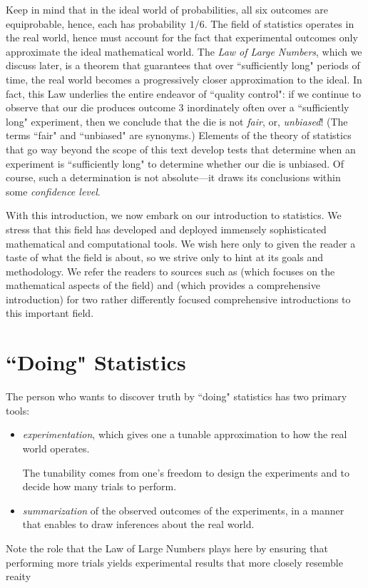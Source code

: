   
Keep in mind that in the ideal world of probabilities, all six outcomes are equiprobable, hence, 
each has probability $1/6$.  The field of statistics operates in the real world, hence must 
account for the fact that experimental outcomes only approximate the ideal mathematical world.  
The {\it Law of Large Numbers}, which we discuss later, is a theorem that guarantees that over 
``sufficiently long" periods of time, the real world becomes a progressively closer approximation 
to the ideal. In fact, this Law underlies the entire endeavor of ``quality control": if we continue to 
observe that our die produces outcome $3$ inordinately often over a ``sufficiently long" 
experiment, then we conclude that the die is not {\em fair}, or, {\em unbiased}!  (The terms
``fair" and ``unbiased" are synonyms.) Elements of the theory of statistics that go way beyond 
the scope of this text develop tests that determine when an experiment is ``sufficiently long" to 
determine whether our die is unbiased.  Of course, such a determination is not absolute---it
draws its conclusions within some {\em confidence level}.

With this introduction, we now embark on our introduction to statistics.  We stress that this
field has developed and deployed immensely sophisticated mathematical and
computational tools.  We wish here only to given the reader a taste of what the field is
about, so we strive only to hint at its goals and methodology.  We refer the readers to sources
such as \cite{Hoel58} (which focuses on the mathematical aspects of the field) and 
\cite{Bremaud17}  (which provides a comprehensive introduction) for two rather differently
focused comprehensive introductions to this important field.

\section{``Doing" Statistics}
\label{sec:doing-statistics}


The person who wants to discover truth by ``doing" statistics has two primary tools:
\begin{itemize}
\item
{\em experimentation}, which gives one a tunable approximation to how the real world 
operates.

The tunability comes from one's freedom to design the experiments and to decide how
many trials to perform.

\item 
{\em summarization} of the observed outcomes of the experiments, in a manner that 
enables to draw inferences about the real world.
\end{itemize}
Note the role that the Law of Large Numbers plays here by ensuring that performing
more trials yields experimental results that more closely resemble reaity


